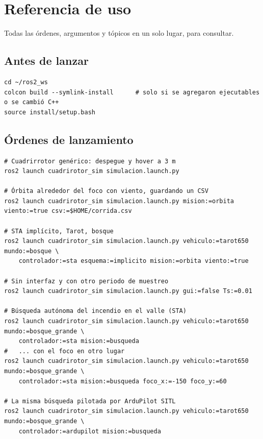 \chapter{Referencia de uso}

\begin{enpocas}
Todas las órdenes, argumentos y tópicos en un solo lugar, para consultar.
\end{enpocas}

\section{Antes de lanzar}

\begin{lstlisting}[style=bash]
cd ~/ros2_ws
colcon build --symlink-install      # solo si se agregaron ejecutables o se cambió C++
source install/setup.bash
\end{lstlisting}

\section{Órdenes de lanzamiento}

\begin{lstlisting}[style=bash]
# Cuadrirrotor genérico: despegue y hover a 3 m
ros2 launch cuadrirotor_sim simulacion.launch.py

# Órbita alrededor del foco con viento, guardando un CSV
ros2 launch cuadrirotor_sim simulacion.launch.py mision:=orbita viento:=true csv:=$HOME/corrida.csv

# STA implícito, Tarot, bosque
ros2 launch cuadrirotor_sim simulacion.launch.py vehiculo:=tarot650 mundo:=bosque \
    controlador:=sta esquema:=implicito mision:=orbita viento:=true

# Sin interfaz y con otro periodo de muestreo
ros2 launch cuadrirotor_sim simulacion.launch.py gui:=false Ts:=0.01

# Búsqueda autónoma del incendio en el valle (STA)
ros2 launch cuadrirotor_sim simulacion.launch.py vehiculo:=tarot650 mundo:=bosque_grande \
    controlador:=sta mision:=busqueda
#   ... con el foco en otro lugar
ros2 launch cuadrirotor_sim simulacion.launch.py vehiculo:=tarot650 mundo:=bosque_grande \
    controlador:=sta mision:=busqueda foco_x:=-150 foco_y:=60

# La misma búsqueda pilotada por ArduPilot SITL
ros2 launch cuadrirotor_sim simulacion.launch.py vehiculo:=tarot650 mundo:=bosque_grande \
    controlador:=ardupilot mision:=busqueda
\end{lstlisting}

